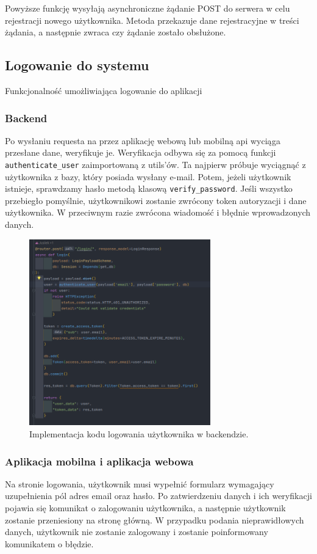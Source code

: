 Powyższe funkcję wysyłają asynchroniczne żądanie POST do serwera w celu rejestracji nowego użytkownika. Metoda przekazuje dane rejestracyjne w treści żądania, a następnie zwraca czy żądanie zostało obsłużone.

\subsection{Logowanie do systemu}
Funkcjonalność umożliwiająca logowanie do aplikacji

\subsubsection{Backend}
Po wysłaniu requesta na przez aplikację webową lub mobilną api wyciąga przesłane dane, weryfikuje je.
Weryfikacja odbywa się za pomocą funkcji \texttt{authenticate\_user} zaimportowaną z utils’ów.
Ta najpierw próbuje wyciągnąć z użytkownika z bazy, który posiada wysłany e-mail. Potem, jeżeli użytkownik istnieje, sprawdzamy hasło metodą klasową \texttt{verify\_password}. Jeśli wszystko przebiegło pomyślnie, użytkownikowi zostanie zwrócony token autoryzacji i dane użytkownika. W przeciwnym razie zwrócona wiadomość i błędnie wprowadzonych danych.

\begin{figure}[H]
    \centering
    \includegraphics[width=0.7\textwidth]{chapters/chapter_8/screens/logowanie_backend}
    \caption{Implementacja kodu logowania użytkownika w backendzie.}
    \label{img:logowanie_backend}
\end{figure}

\subsubsection{Aplikacja mobilna i aplikacja webowa}
Na stronie logowania, użytkownik musi wypełnić formularz wymagający uzupełnienia pól adres email oraz hasło. Po zatwierdzeniu danych i ich weryfikacji pojawia się komunikat o zalogowaniu użytkownika, a następnie użytkownik zostanie przeniesiony na stronę główną. W przypadku podania nieprawidłowych danych, użytkownik nie zostanie zalogowany i zostanie poinformowany komunikatem o błędzie.

